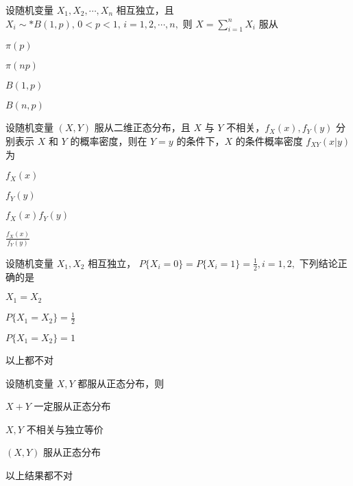 \documentclass{exam-zh}
\begin{document}
\begin{question}
  设随机变量 $X_1, X_2, \cdots, X_n$ 相互独立，且  
  $X_i \sim* B(1, p), \, 0 < p < 1, \, i = 1, 2, \cdots, n,$  
  则  
  $X = \sum_{i=1}^n X_i$  
  服从 \paren[D]
  \begin{choices}
    \item $\pi(p)$  
    \item $\pi(np)$  
    \item $B(1, p)$  
    \item $B(n, p)$  
  \end{choices}
\end{question}

\begin{question}
  设随机变量 $(X, Y)$ 服从二维正态分布，且 $X$ 与 $Y$ 不相关，$f_X(x), f_Y(y)$ 分别表示 $X$ 和 $Y$ 的概率密度，则在 $Y = y$ 的条件下，$X$ 的条件概率密度  
  $f_{XY}(x|y)$ 为 \paren[A]
  \begin{choices}
    \item $f_X(x)$  
    \item $f_Y(y)$  
    \item $f_X(x)f_Y(y)$  
    \item $\frac{f_X(x)}{f_Y(y)}$  
  \end{choices}
\end{question}

\begin{question}
  设随机变量 $X_1, X_2$ 相互独立，  
  $P\{X_i = 0\} = P\{X_i = 1\} = \frac{1}{2}, i = 1, 2,$  
  下列结论正确的是 \paren[B]
  \begin{choices}
    \item $X_1 = X_2$  
    \item $P\{X_1 = X_2\} = \frac{1}{2}$  
    \item $P\{X_1 = X_2\} = 1$  
    \item 以上都不对  
  \end{choices}
\end{question}

\begin{question}
  设随机变量 $X,Y$ 都服从正态分布，则 \paren[D]
  \begin{choices}
    \item $X+Y$ 一定服从正态分布  
    \item $X,Y$ 不相关与独立等价  
    \item $(X,Y)$ 服从正态分布  
    \item 以上结果都不对  
  \end{choices}
\end{question}
\end{document}
